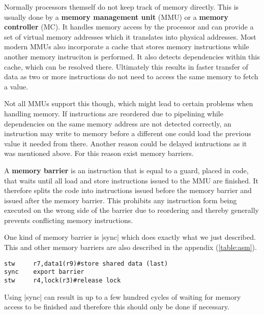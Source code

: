 Normally processors themself do not keep track of memory directly.
This is usually done by a \textbf{memory management unit} (MMU) or a \textbf{memory controller} (MC).
It handles memory access by the processor and can provide a set of virtual memory addresses which it translates into physical addresses.
Most modern MMUs also incorporate a cache that stores memory instructions while another memory instruciton is performed.
It also detects dependencies within this cache, which can be resolved there.
Ultimately this results in faster transfer of data as two or more instructions do not need to access the same memory to fetch a value.

Not all MMUs support this though, which might lead to certain problems when handling memory.
If instructions are reordered due to pipelining while dependencies on the same memory address are not detected correctly, an instruction may write to memory before a different one could load the previous value it needed from there.
Another reason could be delayed isntructions as it was mentioned above.
For this reason exist memory barriers.

A \textbf{memory barrier} is an instruction that is equal to a guard, placed in code, that waits until all load and store instructions issued to the MMU are finished.
It therefore splits the code into instructions issued before the memory barrier and issued after the memory barrier.
This prohibits any instruction form being executed on the wrong side of the barrier due to reordering and thereby generally prevents conflicting memory instructions.

One kind of memory barrier is |sync| which does exactly what we just described.
This and other memory barriers are also described in the appendix (\ref{table:asm}).

\begin{lstlisting}[caption=The memory barrier ensures that the first store was performed before the second store is issued., label=lst:sync]
stw     r7,data1(r9)#store shared data (last)
sync    export barrier
stw     r4,lock(r3)#release lock
\end{lstlisting}

Using |sync| can result in up to a few hundred cycles of waiting for memory access to be finished and therefore this should only be done if necessary.

